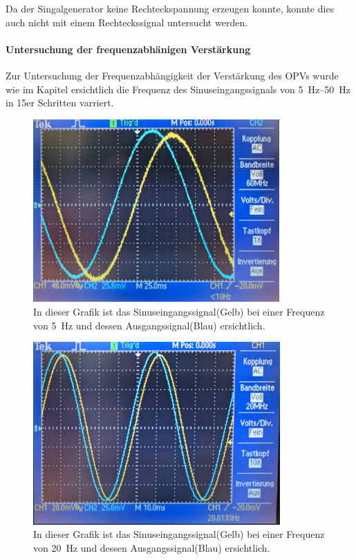 \documentclass[12pt,english,ngerman]{scrartcl}
\begin{document}
Da der Singalgenerator \cite{funktionsgenerator} keine Rechteckspannung erzeugen konnte, konnte
dies auch nicht mit einem Rechteckssignal untersucht werden.


\paragraph{Untersuchung der frequenzabhänigen Verstärkung}
Zur Untersuchung der Frequenzabhängigkeit der Verstärkung des OPVs wurde wie im
Kapitel  ersichtlich die Frequenz des
Sinuseingangssignals von \SIrange{5}{50}{\hertz} in 15er Schritten varriert.

\begin{figure}[H]
  \centering
    \includegraphics[width=\linewidth, height=7cm]{./figures/integrator/5hz.jpg}
    \caption{In dieser Grafik ist das Sinuseingangssignal(Gelb) bei einer Frequenz von
    \SI{5}{\Hz} und dessen Ausgangssignal(Blau) ersichtlich.}
  \label{fig:mess_integrator_5hz}
\end{figure}

\begin{figure}[H]
  \centering
    \includegraphics[width=\linewidth, height=7cm]{./figures/integrator/20hz.jpg}
    \caption{In dieser Grafik ist das Sinuseingangssignal(Gelb) bei einer Frequenz von
    \SI{20}{\Hz} und dessen Ausgangssignal(Blau) ersichtlich.}
  \label{fig:mess_integrator_20hz}
\end{figure}
\end{document}
